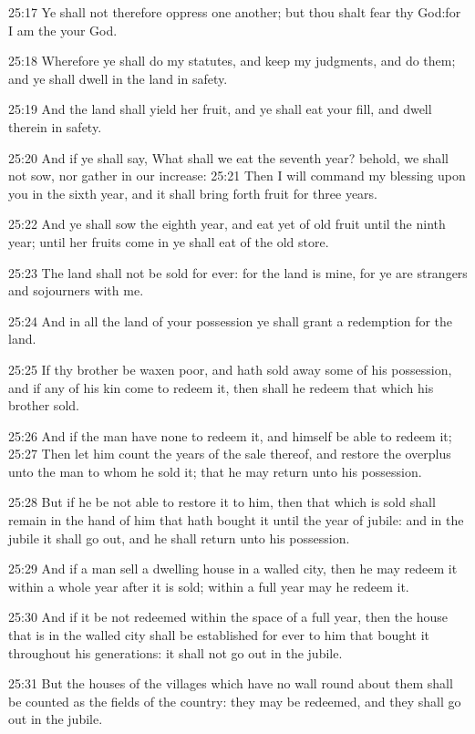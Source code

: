 25:17 Ye shall not therefore oppress one another; but thou shalt fear thy God:for I am the \LORD your God.

25:18 Wherefore ye shall do my statutes, and keep my judgments, and do them; and ye shall dwell in the land in safety.

25:19 And the land shall yield her fruit, and ye shall eat your fill, and dwell therein in safety.

25:20 And if ye shall say, What shall we eat the seventh year? behold, we shall not sow, nor gather in our increase: 25:21 Then I will command my blessing upon you in the sixth year, and it shall bring forth fruit for three years.

25:22 And ye shall sow the eighth year, and eat yet of old fruit until the ninth year; until her fruits come in ye shall eat of the old store.

25:23 The land shall not be sold for ever: for the land is mine, for ye are strangers and sojourners with me.

25:24 And in all the land of your possession ye shall grant a redemption for the land.

25:25 If thy brother be waxen poor, and hath sold away some of his possession, and if any of his kin come to redeem it, then shall he redeem that which his brother sold.

25:26 And if the man have none to redeem it, and himself be able to redeem it; 25:27 Then let him count the years of the sale thereof, and restore the overplus unto the man to whom he sold it; that he may return unto his possession.

25:28 But if he be not able to restore it to him, then that which is sold shall remain in the hand of him that hath bought it until the year of jubile: and in the jubile it shall go out, and he shall return unto his possession.

25:29 And if a man sell a dwelling house in a walled city, then he may redeem it within a whole year after it is sold; within a full year may he redeem it.

25:30 And if it be not redeemed within the space of a full year, then the house that is in the walled city shall be established for ever to him that bought it throughout his generations: it shall not go out in the jubile.

25:31 But the houses of the villages which have no wall round about them shall be counted as the fields of the country: they may be redeemed, and they shall go out in the jubile.

